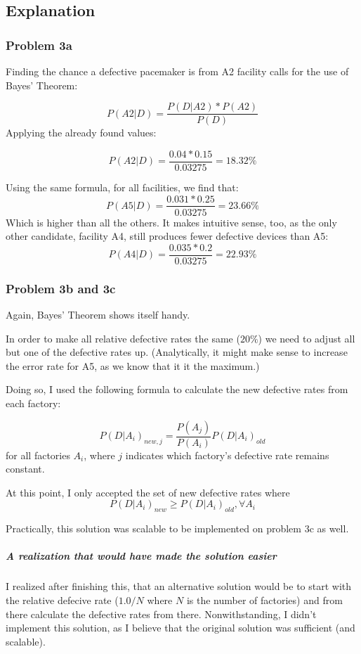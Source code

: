 \documentclass[a4paper,11pt]{article}
\begin{document}
\subsection{Explanation}
\subsubsection{Problem 3a}
Finding the chance a defective pacemaker is from A2 facility calls for the use of Bayes' Theorem:

\[ P(A2 \vert D  ) = \frac{P(D\vert A2  ) * P(A2) }{P(D)} \]
Applying the already found values:

\[ P(A2 \vert D  ) = \frac{0.04 * 0.15 }{0.03275}  = 18.32 \%\]

Using the same formula, for all facilities, we find that:
\[ P(A5 \vert D  ) = \frac{0.031 * 0.25 }{0.03275}  = 23.66\%\]
Which is higher than all the others.
It makes intuitive sense, too, as the only other candidate, facility A4, still produces fewer defective devices than A5:
\[ P(A4 \vert D  ) = \frac{0.035 * 0.2 }{0.03275}  = 22.93\%\]

\subsubsection{Problem 3b and 3c}
Again, Bayes' Theorem shows itself handy.

In order to make all relative defective rates the same ($20\%$) we need to adjust all but one of the defective rates up.
(Analytically, it might make sense to increase the error rate for A5, as we know that it it the maximum.)

Doing so, I used the following formula to calculate the new defective rates from each factory:

\[
P(D \vert A_i)_{new, j} = \frac{P(A_j)}{P(A_i)}P(D\vert A_i)_{old}
\]
for all factories $A_i$, where $j$ indicates which factory's defective rate remains constant.

At this point, I only accepted the set of new defective rates where
\[
P(D \vert A_i)_{new} \geq P(D \vert A_i)_{old},   \forall   A_i
\]

Practically, this solution was scalable to be implemented on problem 3c as well.

\subparagraph{A realization that would have made the solution easier}

I realized after finishing this, that an alternative solution would be to start with the relative defecive rate ($1.0 / N$ where $N$ is the number of factories) and from there calculate the defective rates from there.
Nonwithstanding, I didn't implement this solution, as I believe that the original solution was sufficient (and scalable).
\end{document}
